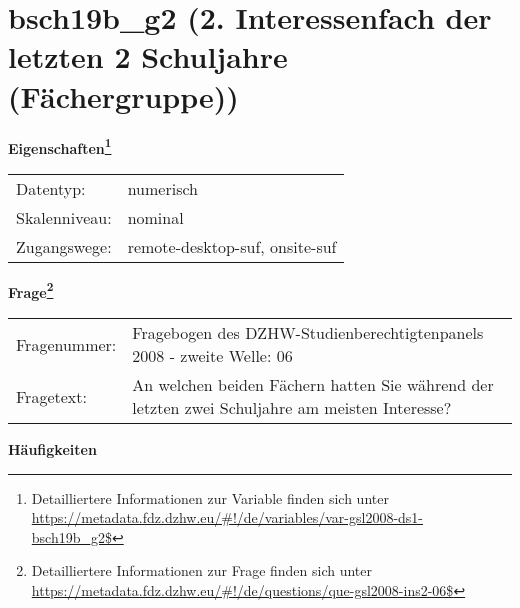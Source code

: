 
    \setcounter{footnote}{0}

    \vspace*{-1.8cm}
	\section{bsch19b\_g2 (2. Interessenfach der letzten 2 Schuljahre (Fächergruppe))}
	\label{section:bsch19b_g2}



    \vspace*{0.5cm}
    \noindent\textbf{Eigenschaften\footnote{Detailliertere Informationen zur Variable finden sich unter
		\url{https://metadata.fdz.dzhw.eu/\#!/de/variables/var-gsl2008-ds1-bsch19b_g2$}}}\\
	\begin{tabularx}{\hsize}{@{}lX}
	Datentyp: & numerisch \\
	Skalenniveau: & nominal \\
	Zugangswege: &
	  remote-desktop-suf, 
	  onsite-suf
 \\
    \end{tabularx}



				\vspace*{0.5cm}
                \noindent\textbf{Frage\footnote{Detailliertere Informationen zur Frage finden sich unter
		              \url{https://metadata.fdz.dzhw.eu/\#!/de/questions/que-gsl2008-ins2-06$}}}\\
				\begin{tabularx}{\hsize}{@{}lX}
					Fragenummer: &
					  Fragebogen des DZHW-Studienberechtigtenpanels 2008 - zweite Welle:
					  06
 \\
					Fragetext: & An welchen beiden Fächern hatten Sie während der letzten zwei Schuljahre am meisten Interesse? \\
				\end{tabularx}





        		\vspace*{0.5cm}
                \noindent\textbf{Häufigkeiten}

